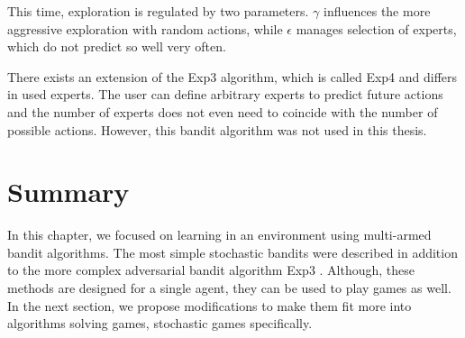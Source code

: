\documentclass[../main.tex]{subfiles}
\begin{document}
This time, exploration is regulated by two parameters.
$\gamma$ influences the more aggressive exploration with random actions, while $\epsilon$ manages selection of experts, which do not predict so well very often.

There exists an extension of the Exp3 algorithm, which is called Exp4 and differs in used experts.
The user can define arbitrary experts to predict future actions and the number of experts does not even need to coincide with the number of possible actions.
However, this bandit algorithm was not used in this thesis.

\section{Summary}
In this chapter, we focused on learning in an environment using multi-armed bandit algorithms.
The most simple stochastic bandits were described in addition to the more complex adversarial bandit algorithm Exp3 .
Although, these methods are designed for a single agent, they can be used to play games as well.
In the next section, we propose modifications to make them fit more into algorithms solving games, stochastic games specifically.
\end{document}
